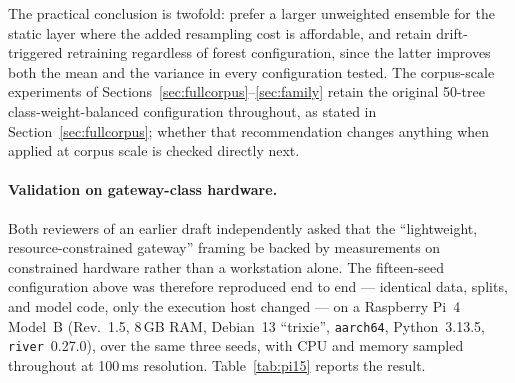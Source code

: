 \documentclass[11pt,a4paper]{article}
\begin{document}
The practical conclusion is twofold: prefer a larger unweighted ensemble for
the static layer where the added resampling cost is affordable, and retain
drift-triggered retraining regardless of forest configuration, since the
latter improves both the mean and the variance in every configuration tested.
The corpus-scale experiments of
Sections~\ref{sec:fullcorpus}--\ref{sec:family} retain the original 50-tree
class-weight-balanced configuration throughout, as stated in
Section~\ref{sec:fullcorpus}; whether that recommendation changes anything
when applied at corpus scale is checked directly next.

\begin{table}[!ht]
\centering
\caption{Fifteen-seed replication with independent stratified splits and
the 100-tree unweighted configuration (mean $\pm$ standard deviation).}
\label{tab:fifteen}
\small
{}
\end{table}

\paragraph{Validation on gateway-class hardware.} Both reviewers of an
earlier draft independently asked that the ``lightweight,
resource-constrained gateway'' framing be backed by measurements on
constrained hardware rather than a workstation alone. The fifteen-seed
configuration above was therefore reproduced end to end --- identical data,
splits, and model code, only the execution host changed --- on a Raspberry
Pi~4 Model~B (Rev.~1.5, 8\,GB RAM, Debian~13 ``trixie'', \texttt{aarch64},
Python~3.13.5, \texttt{river}~0.27.0), over the same three seeds, with CPU
and memory sampled throughout at 100\,ms resolution. Table~\ref{tab:pi15}
reports the result.
\end{document}
